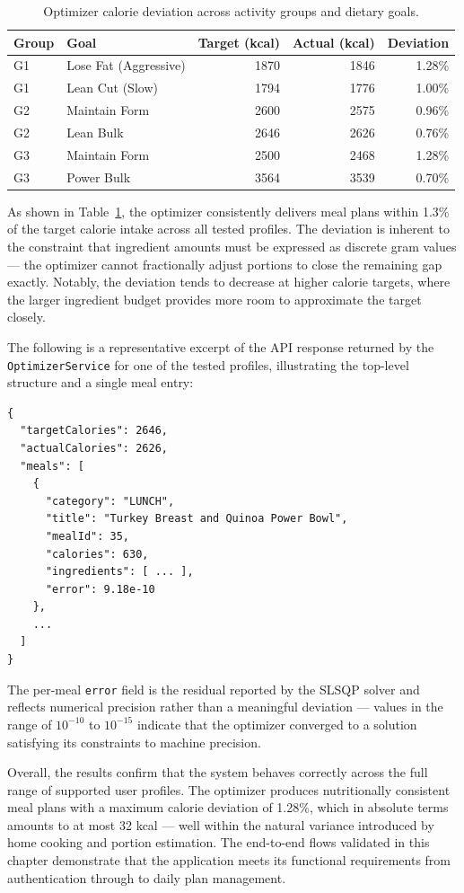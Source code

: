\begin{table}[htbp]
    \centering
    \begin{tabular}{|l|l|r|r|r|}
        \hline
        \textbf{Group} & \textbf{Goal} & \textbf{Target (kcal)} & \textbf{Actual (kcal)} & \textbf{Deviation} \\
        \hline
        G1 & Lose Fat (Aggressive) & 1870 & 1846 & 1.28\% \\
        G1 & Lean Cut (Slow)       & 1794 & 1776 & 1.00\% \\
        G2 & Maintain Form         & 2600 & 2575 & 0.96\% \\
        G2 & Lean Bulk             & 2646 & 2626 & 0.76\% \\
        G3 & Maintain Form         & 2500 & 2468 & 1.28\% \\
        G3 & Power Bulk            & 3564 & 3539 & 0.70\% \\
        \hline
    \end{tabular}
    \caption{Optimizer calorie deviation across activity groups and dietary goals.}
    \label{tab:optimizer_results}
\end{table}

As shown in Table~\ref{tab:optimizer_results}, the optimizer consistently delivers
meal plans within 1.3\% of the target calorie intake across all tested profiles. The
deviation is inherent to the constraint that ingredient amounts must be expressed as
discrete gram values — the optimizer cannot fractionally adjust portions to close the
remaining gap exactly. Notably, the deviation tends to decrease at higher calorie
targets, where the larger ingredient budget provides more room to approximate the
target closely.

The following is a representative excerpt of the API response returned by the
\texttt{OptimizerService} for one of the tested profiles, illustrating the top-level
structure and a single meal entry:

\begin{verbatim}
{
  "targetCalories": 2646,
  "actualCalories": 2626,
  "meals": [
    {
      "category": "LUNCH",
      "title": "Turkey Breast and Quinoa Power Bowl",
      "mealId": 35,
      "calories": 630,
      "ingredients": [ ... ],
      "error": 9.18e-10
    },
    ...
  ]
}
\end{verbatim}

The per-meal \texttt{error} field is the residual reported by the SLSQP solver and
reflects numerical precision rather than a meaningful deviation — values in the range
of $10^{-10}$ to $10^{-15}$ indicate that the optimizer converged to a solution
satisfying its constraints to machine precision.

Overall, the results confirm that the system behaves correctly across the full range of
supported user profiles. The optimizer produces nutritionally consistent meal plans with
a maximum calorie deviation of 1.28\%, which in absolute terms amounts to at most 32 kcal
— well within the natural variance introduced by home cooking and portion estimation.
The end-to-end flows validated in this chapter demonstrate that the application meets
its functional requirements from authentication through to daily plan management.
